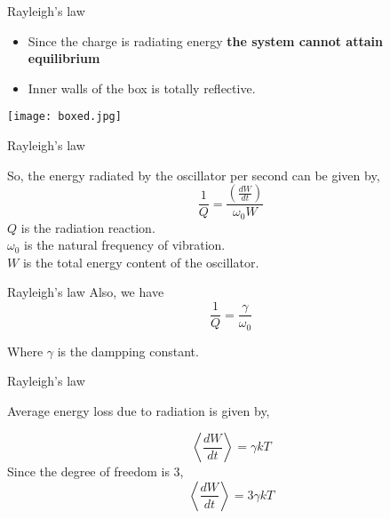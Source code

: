 \documentclass[aspectratio=169]{beamer}
\begin{document}
\begin{frame}{Rayleigh's law}

	 	
		\begin{multicols}{2} 
		
  			\begin{itemize}
  			
  				\item {\large Since the charge is radiating energy \textbf{the system cannot attain equilibrium}}
  				\item {\large Inner walls of the box is totally reflective.}
  				
  			\end{itemize}
  				
 	
	\columnbreak
	
			\texttt{[image: boxed.jpg]}
			
		\end{multicols}
		

	
\end{frame}
		
\begin{frame}{Rayleigh's law}
		
		So, the energy radiated  by the oscillator  per second can be given by, \newline
		{\large \[ \frac{1}{Q} = \frac{\left(\frac{dW}{dt}\right)}{\omega_0 W}\]}\newline
			{\small $Q$ is the radiation reaction. \\ $\omega_0$ is the natural frequency of vibration. \\ $W$ is the total energy content of the oscillator.} 
				
\end{frame}
	
		
\begin{frame}{Rayleigh's law}
		Also, we have 
		\[ \frac{1}{Q}= \frac{\gamma}{\omega_0} \]
			
			\begin{center}		
				{\small Where $\gamma$ is the dampping constant.}
			\end{center}
			
		
\end{frame}


\begin{frame}{Rayleigh's law}

	 \begin{center}
	 
	 	{\large Average energy loss due to radiation is given by,}
	
	 {\large \[ \left<\frac{dW}{dt}\right> = \gamma kT\]}	 
	  {\large Since the degree of freedom is 3,}
	 {\large \[ \left<\frac{dW}{dt}\right> = 3 \gamma kT\]}
	  \end{center} 
\end{frame}
		
\end{document}
